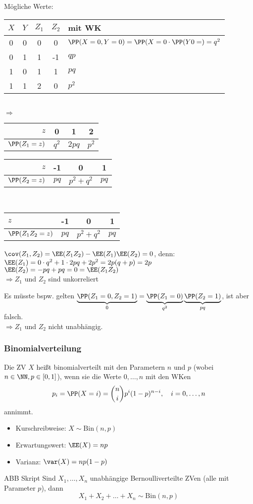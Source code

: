 \begin{anumerate}
\item Mögliche Werte:\\
\begin{tabular}{c c | c c | l}
$X$ & $Y$ & $Z_1$ & $Z_2$ & mit WK\\\hline
0 & 0 & 0 & 0 & $\PP(X=0,Y=0)=\PP(X=0\cdot \PP(Y0=) = q^2$\\
0 & 1 & 1 & -1 & $qp$\\
1 & 0 & 1 & 1 & $pq$\\
1 & 1 & 2 & 0 & $p^2$
\end{tabular}\\
$\Rightarrow$ \begin{tabular}{r | c c c}
$z$ & 0 & 1 & 2\\\hline
$\PP(Z_1=z)$ & $q^2$ & $2pq$ & $p^2$
\end{tabular} \quad \begin{tabular}{r | c c c}
$z$ & -1 & 0 & 1\\\hline
$\PP(Z_2=z)$ & $pq$ & $p^2+q^2$ & $pq$
\end{tabular}\\
\begin{tabular}{l | c c c }
$z$ & -1 &  0 & 1\\\hline
$\PP(Z_1Z_2=z)$ & $pq$ & $p^2+q^2$ & $pq$
\end{tabular}
\item $\cov (Z_1,Z_2)=\EE(Z_1Z_2)-\EE(Z_1) \EE(Z_2) = 0$, denn: \\
$\EE(Z_1)=0\cdot q^2 + 1 \cdot 2 pq + 2 p^2 = 2p(q+p) = 2p$\\
$\EE(Z_2)=-pq+pq = 0 =\EE(Z_1Z_2)$\\
$\Rightarrow Z_1$ und $Z_2$ sind unkorreliert
\item Es müsste bspw. gelten $\underbrace{\PP(Z_1=0, Z_2=1)}_{0}=\underbrace{\PP(Z_1=0)}_{q^2} \underbrace{\PP(Z_2=1)}_{pq}$, ist aber falsch.\\
$\Rightarrow Z_1$ und $Z_2$ nicht unabhängig.
\end{anumerate}
\subsubsection{Binomialverteilung}
 Die ZV $X$ heißt binomialverteilt mit den Parametern $n$ und $p$ (wobei $n \in \NN, p\in [0,1]$), wenn sie die Werte $0,\dots, n$ mit den WKen
$$p_i=\PP(X=i)=\binom{n}{i}p^i (1-p)^{n-i}, \quad i=0,\dots ,n$$
annimmt.
\begin{itemize}
\item Kurschreibweise: $X \sim \mathrm{Bin}(n,p)$
\item Erwartungswert: $\EE(X)=np$
\item Varianz: $\var (X) = np (1-p)$
\end{itemize}
ABB Skript
 Sind $X_1, \dots , X_n$ unabhängige Bernoulliverteilte ZVen (alle mit Parameter $p$), dann 
$$X_1+X_2+\dots + X_n \sim \mathrm{Bin}(n,p)$$

